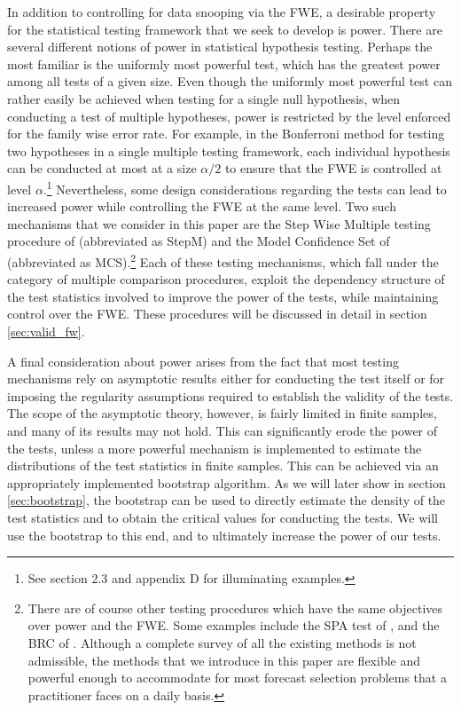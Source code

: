 \documentclass{article} %
\begin{document}
	 In addition to controlling for data snooping via the FWE, a desirable property for the statistical testing framework that we seek to develop is power. There are several different notions of power in statistical hypothesis testing. Perhaps the most familiar is the uniformly most powerful test, which has the greatest power among all tests of a given size. Even though the uniformly most powerful test can rather easily be achieved when testing for a single null hypothesis, when conducting a test of multiple hypotheses, power is restricted by the level enforced for the family wise error rate. For example, in the Bonferroni method for testing two hypotheses in a single multiple testing framework, each individual hypothesis can be conducted at most at a size $\alpha/2$ to ensure that the FWE is controlled at level $\alpha$.\footnote{See \textcite{ROMANOWOLF2005} section 2.3 and \textcite{ROMANOWOLF2005} appendix D for illuminating examples.} Nevertheless, some design considerations regarding the tests can lead to increased power while controlling the FWE at the same level. Two such mechanisms that we consider in this paper are the Step Wise Multiple testing procedure of \textcite{ROMANOWOLF2005} (abbreviated as StepM) and the Model Confidence Set of \textcite{HANSENLUNDE_NASON2011} (abbreviated as MCS).\footnote{There are of course other testing procedures which have the same objectives over power and the FWE. Some examples include the SPA test of \textcite{HANSENSPA2001}, and the BRC of \textcite{WHITE-BRC}. Although a complete survey of all the existing methods is not admissible, the methods that we introduce in this paper are flexible and powerful enough to accommodate for most forecast selection problems that a practitioner faces on a daily basis.} Each of these testing mechanisms, which fall under the category of multiple comparison procedures, exploit the dependency structure of the test statistics involved to improve the power of the tests, while maintaining control over the FWE. These procedures will be discussed in detail in section \ref{sec:valid_fw}.
	 
	 A final consideration about power arises from the fact that most testing mechanisms rely on asymptotic results either for conducting the test itself or for imposing the regularity assumptions required to establish the validity of the tests. The scope of the asymptotic theory, however, is fairly limited in finite samples, and many of its results may not hold. This can significantly erode the power of the tests, unless a more powerful mechanism is implemented to estimate the distributions of the test statistics in finite samples. This can be achieved via an appropriately implemented bootstrap algorithm. As we will later show in section \ref{sec:bootstrap}, the bootstrap can be used to directly estimate the density of the test statistics and to obtain the critical values for conducting the tests. We will use the bootstrap to this end, and to ultimately increase the power of our tests. 
	 
\end{document}
